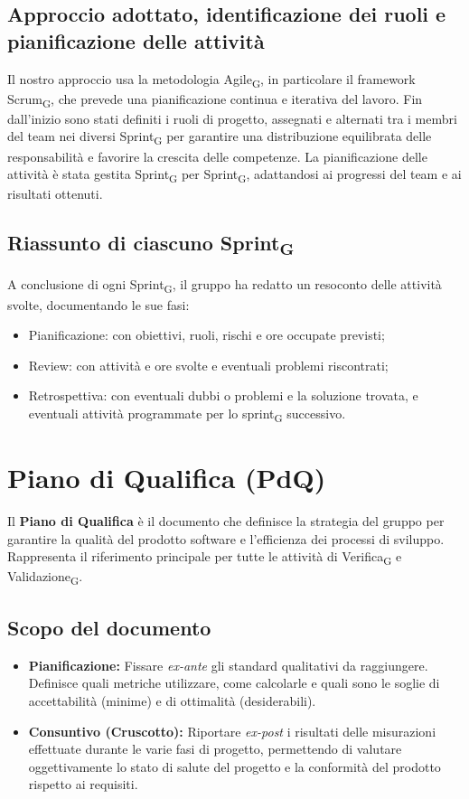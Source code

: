 \documentclass[11pt,a4paper]{article}
\newcommand{\gls}[1]{#1\textsubscript{G}}
\begin{document}
\subsection{Approccio adottato, identificazione dei ruoli e pianificazione delle attività}
Il nostro approccio usa la metodologia \gls{Agile}, in particolare il framework \gls{Scrum}, che prevede una pianificazione continua e iterativa del lavoro. 
Fin dall’inizio sono stati definiti i ruoli di progetto, assegnati e alternati tra i membri del team nei diversi \gls{Sprint} per garantire una distribuzione equilibrata delle responsabilità e favorire la crescita delle competenze.
La pianificazione delle attività è stata gestita \gls{Sprint} per \gls{Sprint}, adattandosi ai progressi del team e ai risultati ottenuti. 

\subsection{Riassunto di ciascuno \gls{Sprint}}
A conclusione di ogni \gls{Sprint}, il gruppo ha redatto un resoconto delle attività svolte, documentando le sue fasi:
\begin{itemize}
\item Pianificazione: con obiettivi, ruoli, rischi e ore occupate previsti;
\item Review: con attività e ore svolte e eventuali problemi riscontrati;
\item Retrospettiva: con eventuali dubbi o problemi e la soluzione trovata, e eventuali attività programmate per lo \gls{sprint} successivo. 
\end{itemize}

\newpage

\section{Piano di Qualifica (PdQ)}
Il \textbf{Piano di Qualifica} è il documento che definisce la strategia del gruppo per garantire la qualità del prodotto software e l'efficienza dei processi di sviluppo. Rappresenta il riferimento principale per tutte le attività di \gls{Verifica} e \gls{Validazione}.

\subsection{Scopo del documento}
\begin{itemize}
    \item \textbf{Pianificazione:} Fissare \textit{ex-ante} gli standard qualitativi da raggiungere. Definisce quali metriche utilizzare, come calcolarle e quali sono le soglie di accettabilità (minime) e di ottimalità (desiderabili).
    \item \textbf{Consuntivo (Cruscotto):} Riportare \textit{ex-post} i risultati delle misurazioni effettuate durante le varie fasi di progetto, permettendo di valutare oggettivamente lo stato di salute del progetto e la conformità del prodotto rispetto ai requisiti.
\end{itemize}
\end{document}
